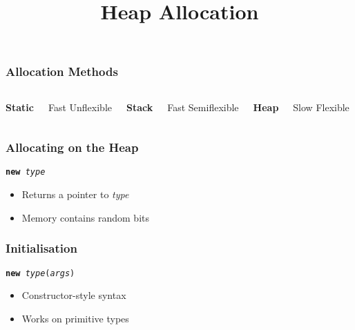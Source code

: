 \usetikzlibrary{shadows,shapes.multipart}

\title{Heap Allocation}







\begin{frame}
  \titlepage
\end{frame}

\begin{frame}
  \frametitle{Allocation Methods}
  \begin{columns}[t]
    \column{3cm}
    \begin{center}
      \textbf{Static}
    \end{center}
    \begin{procontralist}
      \pro Fast
      \con Unflexible
    \end{procontralist}
    \column{3cm}
    \begin{center}
      \textbf{Stack}
    \end{center}
    \begin{procontralist}
      \pro Fast
      \con Semiflexible
    \end{procontralist}
    \column{3cm}
    \begin{center}
      \textbf{Heap}
    \end{center}
    \begin{procontralist}
      \con Slow
      \pro Flexible
    \end{procontralist}
  \end{columns}
\end{frame}

\begin{frame}
  \frametitle{Allocating on the Heap}
  \begin{center}
    \tt {\bfseries new} {\it type}
  \end{center}
  \begin{itemize}
    \item Returns a pointer to {\it type}
    \item Memory contains random bits
  \end{itemize}
  \vskip5mm
\end{frame}

\begin{frame}
  \frametitle{Initialisation}
  \begin{center}
    \tt {\bfseries new} {\it type}({\it args})
  \end{center}
  \begin{itemize}
    \item Constructor-style syntax
    \item Works on primitive types
  \end{itemize}
  \vskip5mm
\end{frame}


